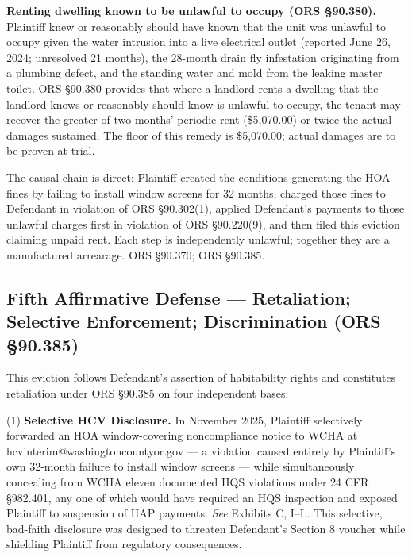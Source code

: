 \documentclass[12pt,letterpaper]{article}
\begin{document}
	\textbf{Renting dwelling known to be unlawful to occupy (ORS \S90.380).} Plaintiff knew or reasonably should have known that the unit was unlawful to occupy given the water intrusion into a live electrical outlet (reported June 26, 2024; unresolved 21 months), the 28-month drain fly infestation originating from a plumbing defect, and the standing water and mold from the leaking master toilet. ORS \S90.380 provides that where a landlord rents a dwelling that the landlord knows or reasonably should know is unlawful to occupy, the tenant may recover the greater of two months' periodic rent (\$5,070.00) or twice the actual damages sustained. The floor of this remedy is \$5,070.00; actual damages are to be proven at trial.
	
	The causal chain is direct: Plaintiff created the conditions generating the HOA fines by failing to install window screens for 32 months, charged those fines to Defendant in violation of ORS \S90.302(1), applied Defendant's payments to those unlawful charges first in violation of ORS \S90.220(9), and then filed this eviction claiming unpaid rent. Each step is independently unlawful; together they are a manufactured arrearage. ORS \S90.370; ORS \S90.385.
	
	\subsection{Fifth Affirmative Defense --- Retaliation; Selective Enforcement; Discrimination (ORS \S90.385)}
	
	This eviction follows Defendant's assertion of habitability rights and constitutes retaliation under ORS \S90.385 on four independent bases:
	
	(1) \textbf{Selective HCV Disclosure.} In November 2025, Plaintiff selectively forwarded an HOA window-covering noncompliance notice to WCHA at hcvinterim@washingtoncountyor.gov --- a violation caused entirely by Plaintiff's own 32-month failure to install window screens --- while simultaneously concealing from WCHA eleven documented HQS violations under 24 CFR \S982.401, any one of which would have required an HQS inspection and exposed Plaintiff to suspension of HAP payments. \textit{See} Exhibits C, I--L. This selective, bad-faith disclosure was designed to threaten Defendant's Section 8 voucher while shielding Plaintiff from regulatory consequences.
	
\end{document}
